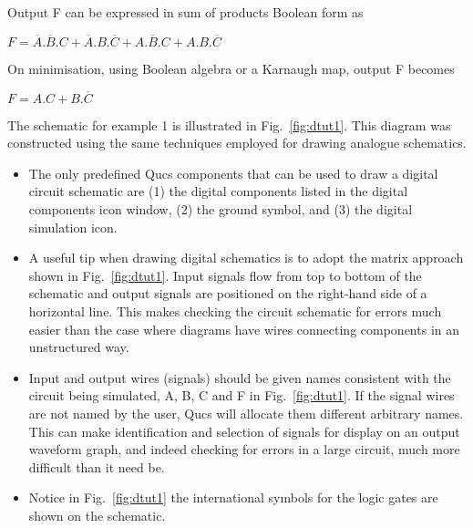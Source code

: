\begin{flushleft}
Output F can be expressed in sum of products Boolean form as
\end{flushleft}
\begin{center}
\begin{large}

$F = \overline{A}.\overline{B}.C + \overline{A}.B.\overline{C}+A.\overline{B}.C+A.B.\overline{C}$\end{large}
\end{center}

\begin{flushleft}
On minimisation, using Boolean algebra or a Karnaugh map, output F becomes
\end{flushleft}
\begin{center}
\begin{large}$F=A.C+B.\overline{C}$\end{large}
\end{center}
The schematic for example 1 is illustrated in Fig.~\ref{fig:dtut1}.
This diagram was constructed using the same techniques employed for
drawing analogue schematics.


\begin{itemize}
\item
The only predefined Qucs components that can be used to draw a digital
circuit schematic are (1) the digital components listed in the digital
components icon window, (2) the ground symbol, and (3) the digital
simulation icon.
\item
A useful tip when drawing digital schematics is to adopt the matrix
approach shown in Fig.~\ref{fig:dtut1}. Input signals flow from top to
bottom of the schematic and output signals are positioned on the
right-hand side of a horizontal line. This makes checking the circuit
schematic for errors much easier than the case where diagrams have
wires connecting components in an unstructured way.
\item
Input and output wires (signals) should be given names consistent with
the circuit being simulated, A, B, C and F in Fig.~\ref{fig:dtut1}.
If the signal wires are not named by the user, Qucs will allocate them
different arbitrary names.  This can make identification and selection
of signals for display on an output waveform graph, and indeed
checking for errors in a large circuit, much more difficult than it
need be.
\item
Notice in Fig.~\ref{fig:dtut1} the international symbols for the logic
gates are shown on the schematic.
\end{itemize}

